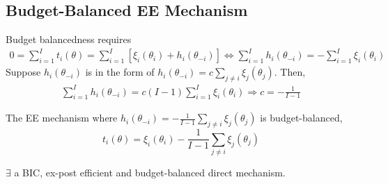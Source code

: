 \documentclass[11pt]{elegantbook}
\begin{document}
\subsection{Budget-Balanced EE Mechanism}
Budget balancedness requires
\begin{equation}
    \begin{aligned}
        0=\sum_{i=1}^I t_i(\theta)=\sum_{i=1}^I[\xi_i(\theta_i)+h_i(\theta_{-i})] \Leftrightarrow \sum_{i=1}^I h_i(\theta_{-i})=-\sum_{i=1}^I \xi_i(\theta_i)
    \end{aligned}
    \nonumber
\end{equation}
Suppose $h_i(\theta_{-i})$ is in the form of $h_i(\theta_{-i})=c\sum_{j\neq i} \xi_j(\theta_j)$. Then,
\begin{equation}
    \begin{aligned}
        \sum_{i=1}^I h_i(\theta_{-i})=c(I-1)\sum_{i=1}^I \xi_i(\theta_i) \Rightarrow c=-\frac{1}{I-1}
    \end{aligned}
    \nonumber
\end{equation}
\begin{proposition}
    The EE mechanism where $h_i(\theta_{-i})=-\frac{1}{I-1}\sum_{j\neq i} \xi_j(\theta_j)$ is budget-balanced, $$t_i(\theta)=\xi_i(\theta_i)-\frac{1}{I-1}\sum_{j\neq i} \xi_j(\theta_j)$$
\end{proposition}

\begin{corollary}
    $\exists$ a BIC, ex-post efficient and budget-balanced direct mechanism.
\end{corollary}
\end{document}
